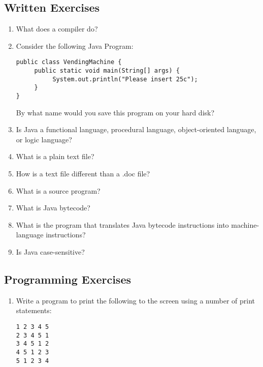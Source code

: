 \subsection{Written Exercises}

\setcounter{counter}{1}
\begin{enumerate}
\item What does a compiler do?
\item Consider the following Java Program:
\begin{lstlisting}
public class VendingMachine {
     public static void main(String[] args) {
          System.out.println("Please insert 25c");
     }
}
\end{lstlisting}
By what name would you save this program on your hard disk?
\item Is Java a functional language, procedural language, object-oriented language, or logic language?
\item What is a plain text file?
\item How is a text file different than a .doc file?
\item What is a source program?
\item What is Java bytecode?
\item What is the program that translates Java bytecode instructions into machine-language instructions?
\item Is Java case-sensitive?
\end{enumerate}

\subsection{Programming Exercises}

\begin{enumerate}
\item Write a program to print the following to the screen using a number of print statements:
\begin{verbatim}
1 2 3 4 5
2 3 4 5 1
3 4 5 1 2
4 5 1 2 3
5 1 2 3 4
\end{verbatim}
\end{enumerate}
